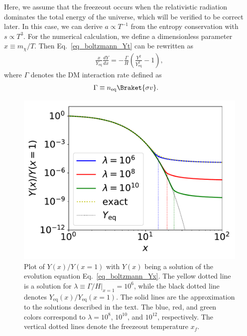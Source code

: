 \documentclass[12pt,twoside,book]{article}
\begin{document}
Here, we assume that the freezeout occurs when the relativistic radiation dominates the total energy of the universe, which will be verified to be correct later.
In this case, we can derive $a \propto T^{-1}$ from the entropy conservation with $s \propto T^3$.
For the numerical calculation, we define a dimensionless parameter $x \equiv m_\chi / T$.
Then Eq.~\eqref{eq_boltzmann_Yt} can be rewritten as
\begin{align}
  \frac{x}{Y_{\mathrm{eq}}} \frac{d Y}{d x} =
  -\frac{\Gamma}{H} \left( \frac{Y^2}{Y_{\mathrm{eq}}^2} - 1 \right),\label{eq_boltzmann_Yx}
\end{align}
where $\Gamma$ denotes the DM interaction rate defined as
\begin{align}
  \Gamma &\equiv n_{\mathrm{eq}} \Braket{\sigma v}.\label{eq_lambda}
\end{align}

\begin{figure}[t]
  \centering
  \includegraphics[width=0.5\hsize]{DMrelic.pdf}
  \caption{
    Plot of $Y(x) / Y(x=1)$ with $Y(x)$ being a solution of the evolution equation Eq.~\eqref{eq_boltzmann_Yx}.
    The yellow dotted line is a solution for $\lambda \equiv \left. \Gamma / H \right|_{x=1} = 10^6$, while the black dotted line denotes $Y_{\mathrm{eq}} (x) / Y_{\mathrm{eq}} (x=1)$.
    The solid lines are the approximation to the solutions described in the text.
    The blue, red, and green colors correspond to $\lambda = 10^8$, $10^{10}$, and $10^{12}$, respectively.
    The vertical dotted lines denote the freezeout temperature $x_f$.
  }
  \label{fig_DM_relic}
\end{figure}
\end{document}
